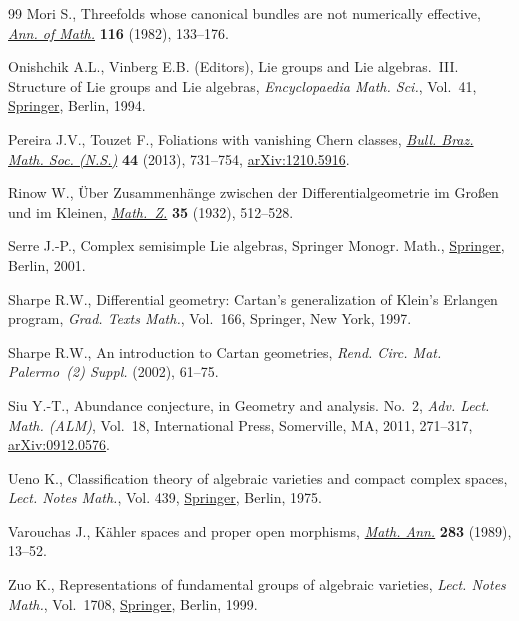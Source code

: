 \documentclass[11pt]{article}
\numberwithin{equation}{section}
\numberwithin{equation}{section}
\begin{document}
\begin{thebibliography}{99}
Mori S., Threefolds whose canonical bundles are not numerically effective,
 \href{https://doi.org/10.2307/2007050}{\textit{Ann. of Math.}} \textbf{116} (1982), 133--176.

Onishchik A.L., Vinberg E.B. (Editors), Lie groups and {L}ie algebras.~{III}.
 {S}tructure of {L}ie groups and {L}ie algebras, \textit{Encyclopaedia Math.
 Sci.}, Vol.~41, \href{https://doi.org/10.1007/978-3-662-03066-0}{Springer}, Berlin, 1994.

Pereira J.V., Touzet F., Foliations with vanishing {C}hern classes,
 \href{https://doi.org/10.1007/s00574-013-0032-8}{\textit{Bull. Braz. Math. Soc. (N.S.)}} \textbf{44} (2013), 731--754,
 \href{https://arxiv.org/abs/1210.5916}{arXiv:1210.5916}.

Rinow W., \"{U}ber {Z}usammenh\"ange zwischen der {D}ifferentialgeometrie im
 {G}ro{\ss}en und im {K}leinen, \href{https://doi.org/10.1007/BF01186567}{\textit{Math.~Z.}} \textbf{35} (1932),
 512--528.

Serre J.-P., Complex semisimple {L}ie algebras, Springer Monogr. Math.,
 \href{https://doi.org/10.1007/978-3-642-56884-8}{Springer}, Berlin, 2001.

Sharpe R.W., Differential geometry: {C}artan's generalization of {K}lein's
 {E}rlangen program, \textit{Grad. Texts Math.}, Vol.~166, Springer, New York,
 1997.

Sharpe R.W., An introduction to {C}artan geometries, \textit{Rend. Circ. Mat. Palermo~(2) Suppl.} (2002), 61--75.

Siu Y.-T., Abundance conjecture, in Geometry and analysis. {N}o.~2, \textit{Adv.
 Lect. Math. (ALM)}, Vol.~18, International Press, Somerville, MA, 2011,
 271--317, \href{https://arxiv.org/abs/0912.0576}{arXiv:0912.0576}.

Ueno K., Classification theory of algebraic varieties and compact complex
 spaces, \textit{Lect. Notes Math.}, Vol. 439, \href{https://doi.org/10.1007/BFb0070570}{Springer}, Berlin, 1975.

Varouchas J., K\"ahler spaces and proper open morphisms, \href{https://doi.org/10.1007/BF01457500}{\textit{Math. Ann.}}
 \textbf{283} (1989), 13--52.

Zuo K., Representations of fundamental groups of algebraic varieties,
 \textit{Lect. Notes Math.}, Vol.~1708, \href{https://doi.org/10.1007/BFb0092569}{Springer}, Berlin, 1999.

\end{thebibliography}
\end{document}
